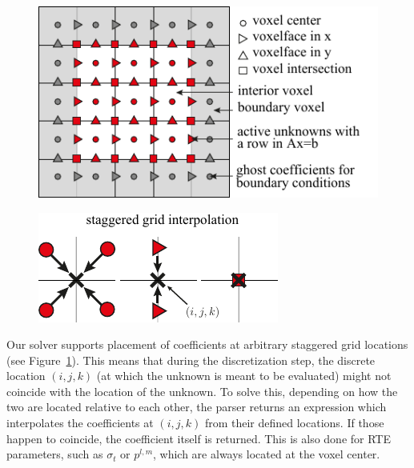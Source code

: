 \begin{figure}[h]

\centering
\includegraphics[width=0.9\columnwidth]{figures/fig_staggered_grids_small.pdf}
\label{fig:staggeredgrid}
\end{figure}

\begin{figure}
\hspace{-.1in}
\includegraphics[width=0.6\columnwidth]{figures/fig_staggered_interpolation_small.pdf}
\vspace{-.1in}
\end{figure}Our solver supports placement of coefficients at arbitrary staggered grid locations (see Figure~\ref{fig:staggeredgrid}). This means that during the discretization step, the discrete location $(i, j, k)$ (at which the unknown is meant to be evaluated) might not coincide with the location of the unknown. To solve this, depending on how the two are located relative to each other, the parser returns an expression which interpolates the coefficients at $(i, j, k)$ from their defined locations. If those happen to coincide, the coefficient itself is returned. This is also done for RTE parameters, such as $\sigma_t$ or $p^{l,m}$, which are always located at the voxel center.


